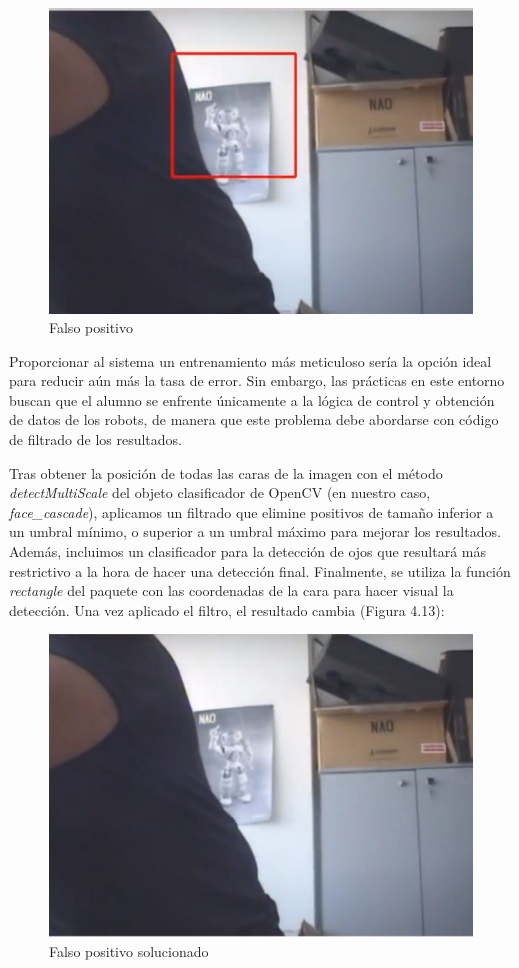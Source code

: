 \begin{figure}[H]
  \begin{center}
    \includegraphics[width=0.70\linewidth]{figures/falsopositivo.jpg}
		\caption{Falso positivo}
		\label{fig.falsopositivo}
		\end{center}
\end{figure}

Proporcionar al sistema un entrenamiento más meticuloso sería la opción ideal para reducir aún más la tasa de error. Sin embargo, las prácticas en este entorno buscan que el alumno se enfrente únicamente a la lógica de control y obtención de datos de los robots, de manera que este problema debe abordarse con código de filtrado de los resultados.

Tras obtener la posición de todas las caras de la imagen con el método \textit{detectMultiScale} del objeto clasificador de OpenCV (en nuestro caso, \textit{face\_cascade}), aplicamos un filtrado que elimine positivos de tamaño inferior a un umbral mínimo, o superior a un umbral máximo para mejorar los resultados. Además, incluimos un clasificador para la detección de ojos que resultará más restrictivo a la hora de hacer una detección final. Finalmente, se utiliza la función \textit{rectangle} del paquete con las coordenadas de la cara para hacer visual la detección. Una vez aplicado el filtro, el resultado cambia (Figura 4.13):

\begin{figure}[H]
  \begin{center}
    \includegraphics[width=0.70\linewidth]{figures/falsopositivosolved.jpg}
		\caption{Falso positivo solucionado}
		\label{fig.falsopositivosolved}
		\end{center}
\end{figure}

